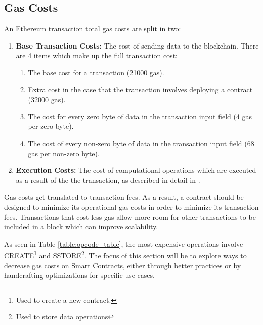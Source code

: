 \subsection{Gas Costs}
An Ethereum transaction total gas costs are split in two: %
\begin{enumerate}
    \item \textbf{Base Transaction Costs:} The cost of sending data to the blockchain. There are 4 items which make up the full transaction cost:
        \begin{enumerate}
            \item The base cost for a transaction (21000 gas). %
            \item Extra cost in the case that the transaction involves deploying a contract (32000 gas).
            \item The cost for every zero byte of data in the transaction input field (4 gas per zero byte).
            \item The cost of every non-zero byte of data in the transaction input field (68 gas per non-zero byte).
        \end{enumerate}
    \item \textbf{Execution Costs:} The cost of computational operations which are executed as a result of the the transaction, as described in detail in \cite{ethereum, gas}.
\end{enumerate} 

Gas costs get translated to transaction fees. As a result, a contract should be designed to minimize its operational gas costs in order to minimize its transaction fees. Transactions that cost less gas allow more room for other transactions to be included in a block which can improve scalability. %




As seen in Table \ref{table:opcode_table}, the most expensive operations involve CREATE\footnote{Used to create a new contract.} and SSTORE\footnote{Used to store data operations}. The focus of this section will be to explore ways to decrease gas costs on Smart Contracts, either through better practices or by handcrafting optimizations for specific use cases.


